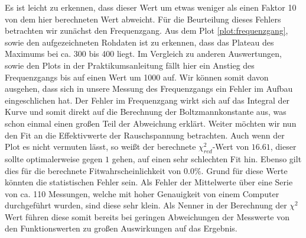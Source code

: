 Es ist leicht zu erkennen, dass dieser Wert um etwas weniger als einen Faktor 10 von dem hier berechneten Wert abweicht.\newline\noindent
Für die Beurteilung dieses Fehlers betrachten wir zunächst den Frequenzgang. Aus dem Plot \ref{plot:frequenzgang}, sowie den aufgezeichneten Rohdaten ist zu erkennen, dass das Plateau des Maximums bei ca. 300 bis 400 liegt. Im Vergleich zu anderen Auswertungen, sowie den Plots in der Praktikumsanleitung fällt hier ein Anstieg des Frequenzgangs bis auf einen Wert um 1000 auf. Wir können somit davon ausgehen, dass sich in unsere Messung des Frequenzgangs ein Fehler im Aufbau eingeschlichen hat. Der Fehler im Frequenzgang wirkt sich auf das Integral der Kurve und somit direkt auf die Berechnung der Boltzmannkonstante aus, was schon einmal einen großen Teil der Abweichung erklärt.\newline\noindent
Weiter möchten wir nun den Fit an die Effektivwerte der Rauschspannung betrachten. Auch wenn der Plot es nicht vermuten lässt, so weißt der berechnete $\chi^2_{red}$-Wert von $16.61$, dieser sollte optimalerweise gegen $1$ gehen, auf einen sehr schlechten Fit hin. Ebenso gilt dies für die berechnete Fitwahrscheinlichkeit von $0.0\%$. Grund für diese Werte könnten die statistischen Fehler sein. Als Fehler der Mittelwerte über eine Serie von ca. 110 Messungen, welche mit hoher Genauigkeit von einem Computer durchgeführt wurden, sind diese sehr klein. Als Nenner in der Berechnung der $\chi^2$ Wert führen diese somit bereits bei geringen Abweichungen der Messwerte von den Funktionswerten zu großen Auswirkungen auf das Ergebnis.
